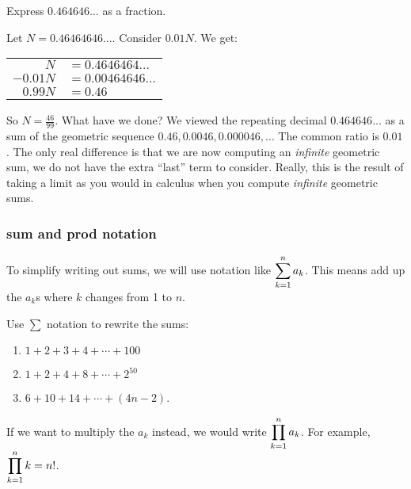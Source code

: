 \documentclass[12pt]{article}
\begin{document}
\begin{example}
  Express $0.464646\ldots$ as a fraction.
  
  \begin{solution}
    Let $N = 0.46464646\ldots$.  Consider $0.01N$.  We get:
    
    \begin{center}
    \begin{tabular}{rl}
     $N$ &$ = 0.4646464\ldots$\\
     $-0.01N$ &$ = 0.00464646\ldots$\\ \hline
     $0.99N$ & $ = 0.46$
    \end{tabular}
    \end{center}
    So $N = \frac{46}{99}$.  What have we done?  We viewed the repeating decimal $0.464646\ldots$ as a sum of the geometric sequence $0.46, 0.0046, 0.000046, \ldots$  The common ratio is $0.01$.  The only real difference is that we are now computing an {\em infinite} geometric sum, we do not have the extra ``last'' term to consider.  Really, this is the result of taking a limit as you would in calculus when you compute \emph{infinite} geometric sums.
  \end{solution}

\end{example}


\subsubsection*{\gls{sum} and \gls{prod} notation}

To simplify writing out sums, we will use notation like $\displaystyle\sum_{k=1}^n a_k$.  This means add up the $a_k$s where $k$ changes from 1 to $n$.

\begin{example}
  Use $\sum$ notation to rewrite the sums:
  \begin{enumerate}
    \item $1 + 2 + 3 + 4 + \cdots + 100$
    \item $1 + 2 + 4 + 8 + \cdots + 2^{50}$
    \item $6 + 10 + 14 + \cdots + (4n - 2)$.
  \end{enumerate}
\end{example}


If we want to multiply the $a_k$ instead, we would write $\displaystyle\prod_{k=1}^n a_k$.  For example, $\displaystyle\prod_{k=1}^n k = n!$.
\end{document}
